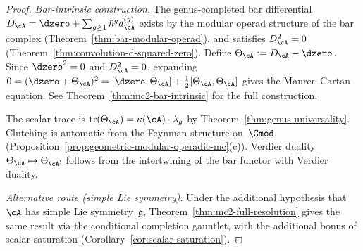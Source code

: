 \begin{proof}
\emph{Bar-intrinsic construction.}
The genus-completed bar differential
$D_\cA = \dzero + \sum_{g \geq 1} \hbar^g d_\cA^{(g)}$
exists by the modular operad structure of the bar complex
(Theorem~\ref{thm:bar-modular-operad}), and satisfies
$D_\cA^2 = 0$
(Theorem~\ref{thm:convolution-d-squared-zero}).
Define $\Theta_\cA := D_\cA - \dzero$.  Since
$\dzero^2 = 0$ and $D_\cA^2 = 0$, expanding
$0 = (\dzero + \Theta_\cA)^2
= [\dzero, \Theta_\cA] + \tfrac12[\Theta_\cA,\Theta_\cA]$
gives the Maurer--Cartan equation.  See
Theorem~\ref{thm:mc2-bar-intrinsic} for the full construction.

The scalar trace is
$\operatorname{tr}(\Theta_\cA) = \kappa(\cA) \cdot \lambda_g$
by Theorem~\ref{thm:genus-universality}.
Clutching is automatic from the Feynman structure on~$\Gmod$
(Proposition~\ref{prop:geometric-modular-operadic-mc}(c)).
Verdier duality $\Theta_\cA \mapsto \Theta_{\cA^!}$ follows
from the intertwining of the bar functor with Verdier duality.

\emph{Alternative route (simple Lie symmetry).}
Under the additional hypothesis that $\cA$ has simple Lie
symmetry~$\mathfrak{g}$,
Theorem~\ref{thm:mc2-full-resolution} gives the same result
via the conditional completion gauntlet, with the additional
bonus of scalar saturation
(Corollary~\ref{cor:scalar-saturation}).
\end{proof}

